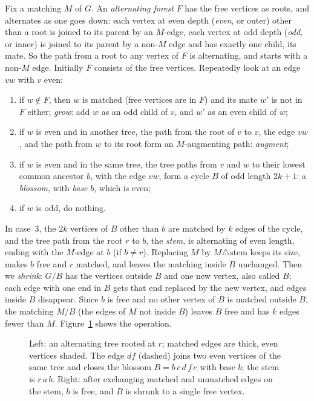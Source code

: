 Fix a matching $M$ of $G$. An \emph{alternating forest} $F$ has the free vertices as roots, and alternates as one goes down: each vertex at even depth (\emph{even}, or outer) other than a root is joined to its parent by an $M$-edge, each vertex at odd depth
(\emph{odd}, or inner) is joined to its parent by a non-$M$ edge and has exactly one child, its mate. So the path from a root to any vertex of $F$ is alternating, and starts with a non-$M$ edge. Initially $F$ consists of the free vertices. Repeatedly
look at an edge $vw$ with $v$ even:
\begin{enumerate}
\item if $w\notin F$, then $w$ is matched (free vertices are in $F$) and its mate $w'$ is not in $F$ either; \emph{grow}: add $w$ as an odd child of $v$, and $w'$ as an even child of $w$;
\item if $w$ is even and in another tree, the path from the root of $v$ to $v$, the edge $vw$, and the path from $w$ to its root form an $M$-augmenting path: \emph{augment};
\item if $w$ is even and in the same tree, the tree paths from $v$ and $w$ to their lowest common ancestor $b$, with the edge $vw$, form a cycle $B$ of odd length $2k+1$: a \emph{blossom}, with \emph{base} $b$, which is even;
\item if $w$ is odd, do nothing.
\end{enumerate}
In case~3, the $2k$ vertices of $B$ other than $b$ are matched by $k$ edges of the cycle, and the tree path from the root $r$ to $b$, the \emph{stem}, is alternating of even length, ending with the $M$-edge at $b$ (if $b\ne r$). Replacing $M$ by $M\triangle\text{stem}$
keeps its size, makes $b$ free and $r$ matched, and leaves the matching inside $B$ unchanged. Then we \emph{shrink}: $G/B$ has the vertices outside $B$ and one new vertex, also called $B$; each edge with one end in $B$ gets that end replaced by the new vertex, and
edges inside $B$ disappear. Since $b$ is free and no other vertex of $B$ is matched outside $B$, the matching $M/B$ (the edges of $M$ not inside $B$) leaves $B$ free and has $k$ edges fewer than $M$. Figure~\ref{fig:blossom} shows the operation.

\begin{figure}[ht]
\centering
{}
\caption{Left: an alternating tree rooted at $r$; matched edges are thick, even vertices shaded. The edge $df$ (dashed) joins two even vertices of the same tree and closes the blossom $B=b\,c\,d\,f\,e$ with base $b$; the stem is $r\,a\,b$.
Right: after exchanging matched and unmatched edges on the stem, $b$ is free, and $B$ is shrunk to a single free vertex.}
\label{fig:blossom}
\end{figure}

